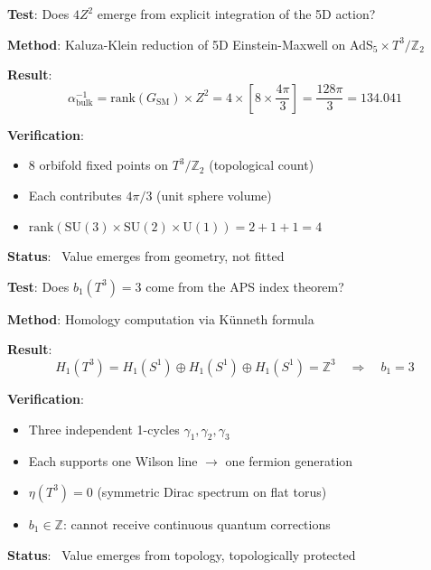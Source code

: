 \documentclass[12pt,a4paper]{article}
\newcommand{\Ztwo}{\mathbb{Z}_2}
\newcommand{\Tthree}{T^3}
\newcommand{\Zsq}{Z^2}
\begin{document}
\begin{tcolorbox}[colback=blue!5!white, colframe=blue!60!black, title=Audit 1: Bulk Calculus (134.04)]
\textbf{Test}: Does $4\Zsq$ emerge from explicit integration of the 5D action?

\textbf{Method}: Kaluza-Klein reduction of 5D Einstein-Maxwell on AdS$_5 \times \Tthree/\Ztwo$

\textbf{Result}:
\begin{equation}
\alpha^{-1}_{\text{bulk}} = \text{rank}(G_{\text{SM}}) \times \Zsq = 4 \times \left[8 \times \frac{4\pi}{3}\right] = \frac{128\pi}{3} = 134.041
\end{equation}

\textbf{Verification}:
\begin{itemize}[itemsep=0pt]
    \item 8 orbifold fixed points on $\Tthree/\Ztwo$ (topological count)
    \item Each contributes $4\pi/3$ (unit sphere volume)
    \item $\text{rank}(\text{SU}(3) \times \text{SU}(2) \times \text{U}(1)) = 2 + 1 + 1 = 4$
\end{itemize}
\textbf{Status}: \checkmark\ Value emerges from geometry, not fitted
\end{tcolorbox}

\begin{tcolorbox}[colback=blue!5!white, colframe=blue!60!black, title=Audit 2: Topological Boundary (+3)]
\textbf{Test}: Does $b_1(\Tthree) = 3$ come from the APS index theorem?

\textbf{Method}: Homology computation via K\"unneth formula

\textbf{Result}:
\begin{equation}
H_1(\Tthree) = H_1(S^1) \oplus H_1(S^1) \oplus H_1(S^1) = \mathbb{Z}^3 \quad \Rightarrow \quad b_1 = 3
\end{equation}

\textbf{Verification}:
\begin{itemize}[itemsep=0pt]
    \item Three independent 1-cycles $\gamma_1, \gamma_2, \gamma_3$
    \item Each supports one Wilson line $\to$ one fermion generation
    \item $\eta(\Tthree) = 0$ (symmetric Dirac spectrum on flat torus)
    \item $b_1 \in \mathbb{Z}$: cannot receive continuous quantum corrections
\end{itemize}
\textbf{Status}: \checkmark\ Value emerges from topology, topologically protected
\end{tcolorbox}
\end{document}
